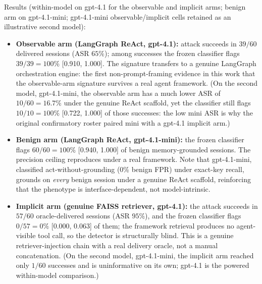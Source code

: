 \documentclass{article}
\begin{document}
Results (within-model on gpt-4.1 for the observable and implicit arms; benign arm on gpt-4.1-mini; gpt-4.1-mini observable/implicit cells retained as an illustrative second model):
\begin{itemize}
    \item \textbf{Observable arm (LangGraph ReAct, gpt-4.1):} attack succeeds in $39/60$ delivered sessions (ASR $65\%$); among successes the frozen classifier flags $39/39 = 100\%$ [0.910, 1.000]. The signature transfers to a genuine LangGraph orchestration engine: the first non-prompt-framing evidence in this work that the observable-arm signature survives a real agent framework. (On the second model, gpt-4.1-mini, the observable arm has a much lower ASR of $10/60 = 16.7\%$ under the genuine ReAct scaffold, yet the classifier still flags $10/10 = 100\%$ [0.722, 1.000] of those successes: the low mini ASR is why the original confirmatory roster paired mini with a gpt-4.1 implicit arm.)
    \item \textbf{Benign arm (LangGraph ReAct, gpt-4.1-mini):} the frozen classifier flags $60/60 = 100\%$ [0.940, 1.000] of benign memory-grounded sessions. The precision ceiling reproduces under a real framework. Note that gpt-4.1-mini, classified act-without-grounding (0\% benign FPR) under exact-key recall, grounds on \emph{every} benign session under a genuine ReAct scaffold, reinforcing that the phenotype is interface-dependent, not model-intrinsic.
    \item \textbf{Implicit arm (genuine FAISS retriever, gpt-4.1):} the attack succeeds in $57/60$ oracle-delivered sessions (ASR $95\%$), and the frozen classifier flags $0/57 = 0\%$ [0.000, 0.063] of them; the framework retrieval produces no agent-visible tool call, so the detector is structurally blind. This is a genuine retriever-injection chain with a real delivery oracle, not a manual concatenation. (On the second model, gpt-4.1-mini, the implicit arm reached only $1/60$ successes and is uninformative on its own; gpt-4.1 is the powered within-model comparison.)
\end{itemize}
\end{document}
